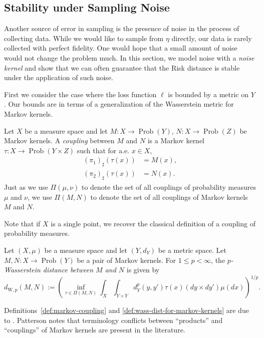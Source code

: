 \documentclass[twoside,11pt]{article}
\DeclareMathOperator{\prob}{Prob}
\newcommand{\dWkernp}[1]{d_{\mathrm{W},#1}}
\begin{document}
\subsection{Stability under Sampling Noise}\label{subsec:stability-noise}
    Another source of error in sampling is the presence of noise in the process of collecting data. While we would like to sample from $\eta$ directly, our data is rarely collected with perfect fidelity. One would hope that a small amount of noise would not change the problem much. In this section, we model noise with a \emph{noise kernel} and show that we can often guarantee that the Risk distance is stable under the application of such noise.

    First we consider the case where the loss function $\ell$ is bounded by a metric on $Y$. Our bounds are in terms of a generalization of the Wasserstein metric for Markov kernels.
    \begin{definition}\label{def:markov-coupling}
        Let $X$ be a measure space and let $M:X\to \prob(Y)$, $N:X\to \prob(Z)$ be Markov kernels. A \emph{coupling} between $M$ and $N$ is a Markov kernel $\tau:X \to \prob(Y\times Z)$ such that for a.e. $x\in X$,
        \begin{align*}
            (\pi_1)_\sharp (\tau(x)) &= M(x),\\
            (\pi_2)_\sharp (\tau(x)) &= N(x).
        \end{align*}
        Just as we use $\Pi(\mu,\nu)$ to denote the set of all couplings of probability measures $\mu$ and $\nu$, we use $\Pi(M,N)$ to denote the set of all couplings of Markov kernels $M$ and $N$.
    \end{definition}
    Note that if $X$ is a single point, we recover the classical definition of a coupling of probability measures.
    \begin{definition}\label{def:wass-dist-for-markov-kernels}
        Let $(X,\mu)$ be a measure space and let $(Y,d_Y)$ be a metric space. Let $M,N:X\to \prob(Y)$ be a pair of Markov kernels. For $1\leq p < \infty$, the \emph{$p$-Wasserstein distance between $M$ and $N$} is given by
        \[\dWkernp{p}(M,N) := \left(\inf_{\tau\in \Pi(M,N)}\int_X \int_{Y\times Y} d_Y^p(y,y') \tau(x)(dy\times dy') \mu(dx) \right)^{1/p}.\]
    \end{definition}
    Definitions~\ref{def:markov-coupling} and \ref{def:wass-dist-for-markov-kernels} are due to \citet[Defs 5.1 and 5.2]{patterson2020}. Patterson notes that terminology conflicts between ``products'' and ``couplings'' of Markov kernels are present in the literature.
\end{document}
